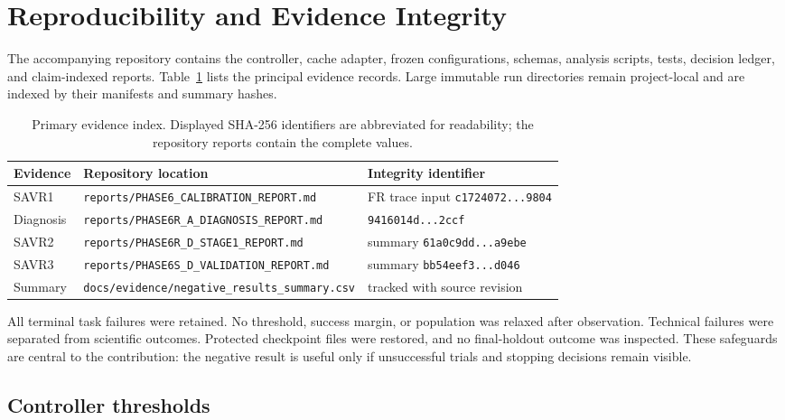 \documentclass[11pt]{article}
\begin{document}
\section{Reproducibility and Evidence Integrity}

The accompanying repository contains the controller, cache adapter, frozen configurations, schemas, analysis scripts, tests, decision ledger, and claim-indexed reports. Table~\ref{tab:evidence} lists the principal evidence records. Large immutable run directories remain project-local and are indexed by their manifests and summary hashes.

\begin{table}[H]
\centering
\scriptsize
\caption{Primary evidence index. Displayed SHA-256 identifiers are abbreviated for readability; the repository reports contain the complete values.}
\label{tab:evidence}
\begin{tabular}{>{\raggedright\arraybackslash}p{1.55cm}>{\raggedright\arraybackslash}p{8.05cm}>{\raggedright\arraybackslash}p{3.75cm}}
\toprule
Evidence & Repository location & Integrity identifier \\
\midrule
SAVR1 & \nolinkurl{reports/PHASE6_CALIBRATION_REPORT.md} & FR trace input \nolinkurl{c1724072...9804} \\
Diagnosis & \nolinkurl{reports/PHASE6R_A_DIAGNOSIS_REPORT.md} & \nolinkurl{9416014d...2ccf} \\
SAVR2 & \nolinkurl{reports/PHASE6R_D_STAGE1_REPORT.md} & summary \nolinkurl{61a0c9dd...a9ebe} \\
SAVR3 & \nolinkurl{reports/PHASE6S_D_VALIDATION_REPORT.md} & summary \nolinkurl{bb54eef3...d046} \\
Summary & \nolinkurl{docs/evidence/negative_results_summary.csv} & tracked with source revision \\
\bottomrule
\end{tabular}
\end{table}

All terminal task failures were retained. No threshold, success margin, or population was relaxed after observation. Technical failures were separated from scientific outcomes. Protected checkpoint files were restored, and no final-holdout outcome was inspected. These safeguards are central to the contribution: the negative result is useful only if unsuccessful trials and stopping decisions remain visible.

\subsection{Controller thresholds}
\end{document}
